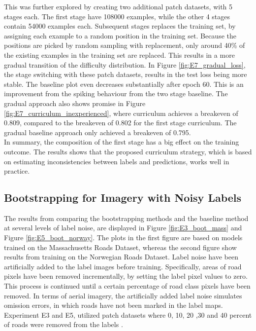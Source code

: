 This was further explored by creating two additional patch datasets, with 5 stages each. The first stage have 108000 examples, while the other 4 stages contain 54000 examples each. Subsequent stages replaces the training set, by assigning each example to a random position in the training set. Because the positions are picked by random sampling with replacement, only around 40\% of the existing examples in the training set are replaced. This results in a more gradual transition of the difficulty distribution. In Figure \ref{fig:E7_gradual_loss}, the stage switching with these patch datasets, results in the test loss being more stable.
The baseline plot even decreases substantially after epoch 60. This is an improvement from the spiking behaviour from the two stage baseline. The gradual approach also shows promise in Figure \ref{fig:E7_curriculum_inexperienced}, where curriculum achieves a breakeven of 0.809, compared to the breakeven of 0.802 for the first stage curriculum. The gradual baseline approach only achieved a breakeven of 0.795.\\

In summary, the composition of the first stage has a big effect on the training outcome. The results shows that the proposed curriculum strategy, which is based on estimating inconsistencies between labels and predictions, works well in practice.

\subsection{Bootstrapping for Imagery with Noisy Labels}
\label{sec:results_bootstrapping}

The results from comparing the bootstrapping methods and the baseline method at several levels of label noise, are displayed in Figure \ref{fig:E3_boot_mass} and Figure \ref{fig:E5_boot_norway}. The plots in the first figure are based on models trained on the Massachusetts Roads Dataset, whereas the second figure show results from training on the Norwegian Roads Dataset. Label noise have been artificially added to the label images before training. Specifically, areas of road pixels have been removed incrementally, by setting the label pixel values to zero. This process is continued until a certain percentage of road class pixels have been removed. In terms of aerial imagery, the artificially added label noise simulates omission errors, in which roads have not been marked in the label maps. Experiment E3 and E5, utilized patch datasets where 0, 10, 20 ,30 and 40 percent of roads were removed from the labels .\\

